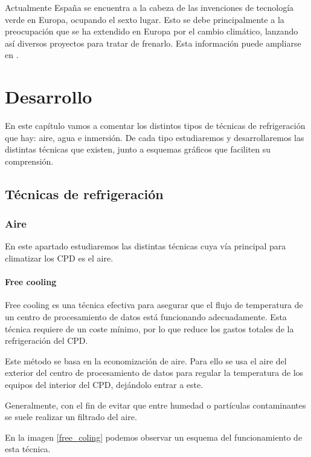 Actualmente España se encuentra a la cabeza de las invenciones de tecnología verde en Europa, ocupando el sexto lugar. Esto se debe principalmente a la preocupación que se ha extendido en Europa por el cambio climático, lanzando así diversos proyectos para tratar de frenarlo. Esta información puede ampliarse en \cite{efe}.



\chapter{Desarrollo}

En este capítulo vamos a comentar los distintos tipos de técnicas de refrigeración que hay: aire, agua e inmersión. De cada tipo estudiaremos y desarrollaremos las distintas técnicas que existen, junto a esquemas gráficos que faciliten su comprensión.

\section{Técnicas de refrigeración}

\subsection{Aire} \label{aire}

En este apartado estudiaremos las distintas técnicas cuya vía principal para climatizar los CPD es el aire.

\subsubsection{Free cooling}

Free cooling \cite{gento} es una técnica efectiva para asegurar que el flujo de temperatura de un centro de procesamiento de datos está funcionando adecuadamente. Esta técnica requiere de un coste mínimo, por lo que reduce los gastos totales de la refrigeración del CPD.

Este método se basa en la economización de aire. Para ello se usa el aire del exterior del centro de procesamiento de datos para regular la temperatura de los equipos del interior del CPD, dejándolo entrar a este.

Generalmente, con el fin de evitar que entre humedad o partículas contaminantes se suele realizar un filtrado del aire.

En la imagen \eqref{free_coling} podemos observar un esquema del funcionamiento de esta técnica.

